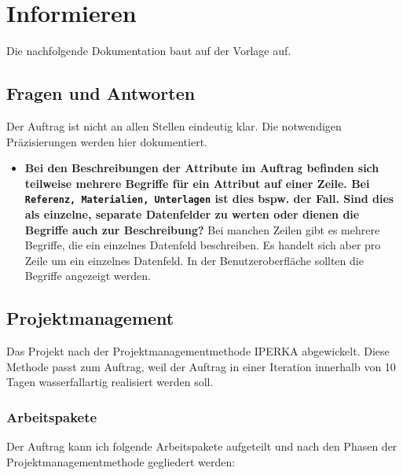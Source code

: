 \chapter{Informieren}
Die nachfolgende Dokumentation baut auf der Vorlage \cite{Buhler_ipa-template_2022} auf.

\section{Fragen und Antworten}
Der Auftrag ist nicht an allen Stellen eindeutig klar. Die notwendigen Präzisierungen werden hier dokumentiert.

\begin{itemize}
  \item \textbf{Bei den Beschreibungen der Attribute im Auftrag befinden sich teilweise mehrere Begriffe für ein Attribut auf einer Zeile. Bei \texttt{Referenz, Materialien, Unterlagen} ist dies bspw. der Fall. Sind dies als einzelne, separate Datenfelder zu werten oder dienen die Begriffe auch zur Beschreibung?} Bei manchen Zeilen gibt es mehrere Begriffe, die ein einzelnes Datenfeld beschreiben. Es handelt sich aber pro Zeile um ein einzelnes Datenfeld. In der Benutzeroberfläche sollten die Begriffe angezeigt werden.
\end{itemize}

\section{Projektmanagement}
Das Projekt nach der Projektmanagementmethode IPERKA abgewickelt. Diese Methode passt zum Auftrag, weil der Auftrag in einer Iteration innerhalb von 10 Tagen wasserfallartig realisiert werden soll.

\subsection{Arbeitspakete}
Der Auftrag kann ich folgende Arbeitspakete aufgeteilt und nach den Phasen der Projektmanagementmethode gegliedert werden:

